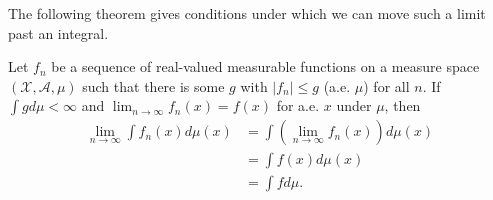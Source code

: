 \documentclass[twoside]{article}
\begin{document}
The following theorem gives conditions under which we can move such a limit
past an integral.

\begin{theorem}\citep[Theorem 2.5, p.~29]{keener}
  Let ${f_n}$ be a sequence of real-valued measurable functions on a
  measure space $(\mathcal X, \mathcal A, \mu)$ such that there is some
  $g$ with $|f_n| \le g$ (a.e. $\mu$) for all $n$.  If $\int g d\mu < \infty$
  and $\lim_{n \rightarrow \infty} f_n(x) = f(x)$ for a.e. $x$ under $\mu$,
  then
  \begin{align*}
    \lim_{n \rightarrow \infty} \int f_n(x) d\mu(x) &= \int
      \left(\lim_{n \rightarrow \infty} f_n(x) \right) d\mu(x) \\
       &= \int f(x) d\mu(x) \\
       &= \int f d\mu.
  \end{align*} 
\end{theorem}
\end{document}

